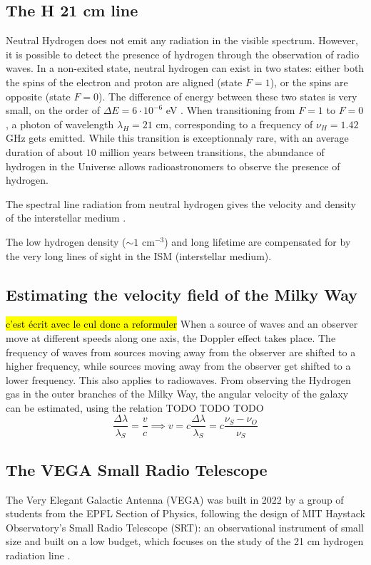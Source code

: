 \subsection{The H 21 cm line}
Neutral Hydrogen does not emit any radiation in the visible spectrum.
However, it is possible to detect the presence of hydrogen through the observation of radio waves.
In a non-exited state, neutral hydrogen can exist in two states: either both the spins of the electron and proton are aligned (state $F=1$), or the spins are opposite (state $F=0$).
The difference of energy between these two states is very small, on the order of $\Delta E = 6 \cdot 10^{-6}$ \si{\electronvolt} \cite{frederic_courbin_introduction_nodate}.
When transitioning from $F=1$ to $F=0$, a photon of wavelength $\lambda_H = 21$ cm, corresponding to a frequency of $\nu_H = 1.42$ GHz gets emitted.
While this transition is exceptionnaly rare, with an average duration of about $10$ million years between transitions, the abundance of hydrogen in the Universe allows radioastronomers to observe the presence of hydrogen.

The spectral line radiation from neutral hydrogen gives the velocity and density of the interstellar medium \cite{burke_introduction_2013}.

The low hydrogen density ($\sim 1$ cm$^{-3}$) and long lifetime are compensated for by the very long lines of sight in the ISM (interstellar medium)\cite{burke_introduction_2013}.

\subsection{Estimating the velocity field of the Milky Way}
\hl{c'est écrit avec le cul donc a reformuler}
When a source of waves and an observer move at different speeds along one axis, the Doppler effect takes place. The frequency of waves from sources moving away from the observer are shifted to a higher frequency, while sources moving away from the observer get shifted to a lower frequency. This also applies to radiowaves.
From observing the Hydrogen gas in the outer branches of the Milky Way, the angular velocity of the galaxy can be estimated, using the relation TODO TODO TODO
\begin{equation}
    \frac{\Delta \lambda}{\lambda_S} = \frac{v}{c} \implies v = c \frac{\Delta \lambda}{\lambda_S} = c \frac{\nu_S - \nu_O}{\nu_S}
\end{equation}

\subsection{The VEGA Small Radio Telescope}
The Very Elegant Galactic Antenna (VEGA) was built in 2022 by a group of students from the EPFL Section of Physics, following the design of MIT Haystack Observatory's Small Radio Telescope (SRT): an observational instrument of small size and built on a low budget, which focuses on the study of the 21 cm hydrogen radiation line \cite{interdisciplinary_project_2022}.

